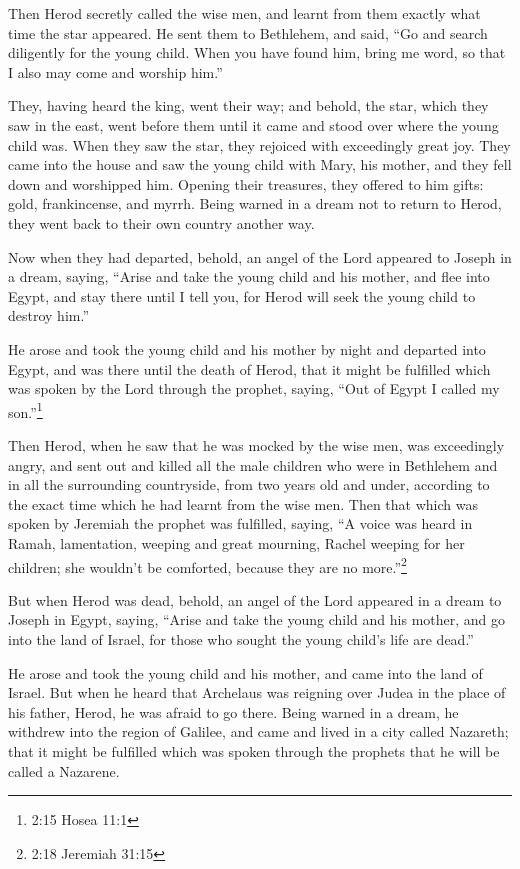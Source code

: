  Then Herod secretly called the wise men, and learnt from
them exactly what time the star appeared.  He sent them to
Bethlehem, and said, ``Go and search diligently for the young child.
When you have found him, bring me word, so that I also may come and
worship him.''

 They, having heard the king, went their way; and behold,
the star, which they saw in the east, went before them until it came and
stood over where the young child was.  When they saw the
star, they rejoiced with exceedingly great joy.  They came
into the house and saw the young child with Mary, his mother, and they
fell down and worshipped him. Opening their treasures, they offered to
him gifts: gold, frankincense, and myrrh.  Being warned in
a dream not to return to Herod, they went back to their own country
another way.

 Now when they had departed, behold, an angel of the Lord
appeared to Joseph in a dream, saying, ``Arise and take the young child
and his mother, and flee into Egypt, and stay there until I tell you,
for Herod will seek the young child to destroy him.''

 He arose and took the young child and his mother by night
and departed into Egypt,  and was there until the death of
Herod, that it might be fulfilled which was spoken by the Lord through
the prophet, saying, ``Out of Egypt I called my son.''\footnote{2:15
  Hosea 11:1}

 Then Herod, when he saw that he was mocked by the wise
men, was exceedingly angry, and sent out and killed all the male
children who were in Bethlehem and in all the surrounding countryside,
from two years old and under, according to the exact time which he had
learnt from the wise men.  Then that which was spoken by
Jeremiah the prophet was fulfilled, saying,  ``A voice was
heard in Ramah, lamentation, weeping and great mourning, Rachel weeping
for her children; she wouldn't be comforted, because they are no
more.''\footnote{2:18 Jeremiah 31:15}

 But when Herod was dead, behold, an angel of the Lord
appeared in a dream to Joseph in Egypt, saying,  ``Arise
and take the young child and his mother, and go into the land of Israel,
for those who sought the young child's life are dead.''

 He arose and took the young child and his mother, and came
into the land of Israel.  But when he heard that Archelaus
was reigning over Judea in the place of his father, Herod, he was afraid
to go there. Being warned in a dream, he withdrew into the region of
Galilee,  and came and lived in a city called Nazareth;
that it might be fulfilled which was spoken through the prophets that he
will be called a Nazarene.

